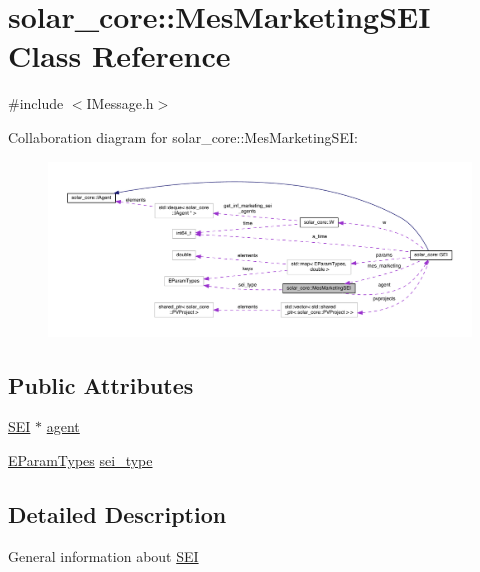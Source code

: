 \hypertarget{classsolar__core_1_1_mes_marketing_s_e_i}{}\section{solar\+\_\+core\+:\+:Mes\+Marketing\+S\+E\+I Class Reference}
\label{classsolar__core_1_1_mes_marketing_s_e_i}


{\ttfamily \#include $<$I\+Message.\+h$>$}



Collaboration diagram for solar\+\_\+core\+:\+:Mes\+Marketing\+S\+E\+I\+:
\nopagebreak
\begin{figure}[H]
\begin{center}
\leavevmode
\includegraphics[width=350pt]{classsolar__core_1_1_mes_marketing_s_e_i__coll__graph}
\end{center}
\end{figure}
\subsection*{Public Attributes}
\begin{DoxyCompactItemize}
\item 
\hyperlink{classsolar__core_1_1_s_e_i}{S\+E\+I} $\ast$ \hyperlink{classsolar__core_1_1_mes_marketing_s_e_i_a5bc5eb8bf309e6ba96cfdc0feb01baa9}{agent}
\item 
\hyperlink{namespacesolar__core_aa1147341e5ef7a40d68d1bd68e149362}{E\+Param\+Types} \hyperlink{classsolar__core_1_1_mes_marketing_s_e_i_a8897df83278137d8ff4b04c068e4370e}{sei\+\_\+type}
\end{DoxyCompactItemize}


\subsection{Detailed Description}
General information about \hyperlink{classsolar__core_1_1_s_e_i}{S\+E\+I} 

